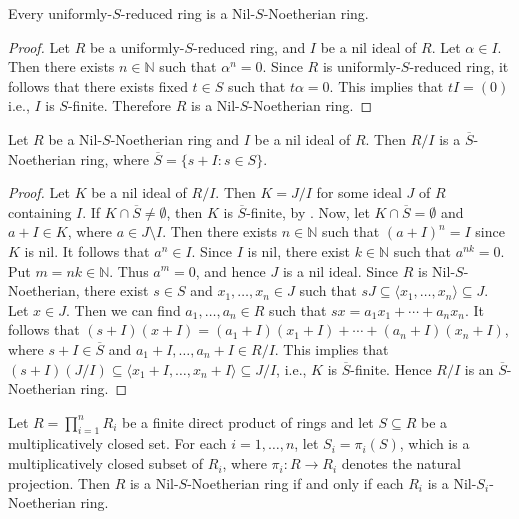 \documentclass[11pt]{article}
\begin{document}
\begin{prop}\label{n4}
Every uniformly-$S$-reduced ring is a Nil-$S$-Noetherian ring.
\end{prop}

\begin{proof}
 Let $R$ be a uniformly-$S$-reduced ring, and $I$ be a nil ideal of $R$. Let $\alpha\in I$. Then there exists $n\in\mathbb{N}$ such that $\alpha^{n}=0$. Since $R$ is uniformly-$S$-reduced ring, it follows that there exists fixed $t\in S$ such that $t\alpha=0$. This implies that $tI=(0)$ i.e., $I$ is $S$-finite. Therefore $R$ is a Nil-$S$-Noetherian ring. 
\end{proof}

\begin{prop}\label{n2}
Let $R$ be a Nil-$S$-Noetherian ring and $I$ be  a nil ideal of $R$. Then $R/I$ is a $\overline{S}$-Noetherian ring, where $\overline{S} = \{s+I: s\in S\}$.
\end{prop}
\begin{proof}
Let $K$ be a nil ideal of $R/I$. Then $K = J/I$ for some ideal $J$ of $R$ containing $I$. If $K\cap \overline{S}\neq\emptyset$, then $K$ is $\overline{S}$-finite, by \cite[Proposition 2(a)]{ad02}. Now, let $K\cap \overline{S}=\emptyset$ and $a+I\in K$, where $a\in J\setminus I$. Then there exists $n\in\mathbb{N}$ such that $(a+I)^{n}=I$ since $K$ is nil. It follows that $a^{n}\in I$. Since $I$ is nil, there exist $k\in\mathbb{N}$ such that $a^{nk}=0$. Put $m=nk\in\mathbb{N}$. Thus $a^{m}=0$, and hence $J$ is a nil ideal. Since $R$ is Nil-$S$-Noetherian, there exist $s\in S$ and $x_{1},\ldots, x_{n}\in J$ such that $sJ\subseteq \langle x_1,\ldots, x_{n} \rangle\subseteq J$. Let $x\in J$. Then we can find $a_1,\ldots, a_n\in R$ such that $sx=a_1x_1+\cdots+a_nx_n$. It follows that $(s+I)(x+I)=(a_1+I)(x_1+I)+\cdots+(a_n+I)(x_n+I)$, where $s+I\in\overline{S}$ and $a_{1}+I,\ldots, a_{n}+I\in R/I$. This implies that $(s+I)(J/I)\subseteq \langle x_1+I,\ldots, x_n+I \rangle\subseteq J/I$, i.e., $K$ is $\overline{S}$-finite. Hence $R/I$ is an $\overline{S}$-Noetherian ring. 
\end{proof}

\begin{prop}
Let $R = \prod\limits_{i=1}^{n} R_{i}$ be a finite direct product of rings and 
let $S \subseteq R$ be a multiplicatively closed set. For each $i = 1, \dots, n$, 
let $S_{i} = \pi_{i}(S)$, which is a multiplicatively closed subset of $R_{i}$, 
where $\pi_{i}: R \to R_{i}$ denotes the natural projection. Then 
$R$ is a Nil-$S$-Noetherian ring if and only if each $R_{i}$ is a Nil-$S_{i}$-Noetherian ring.

\end{prop}
\end{document}
